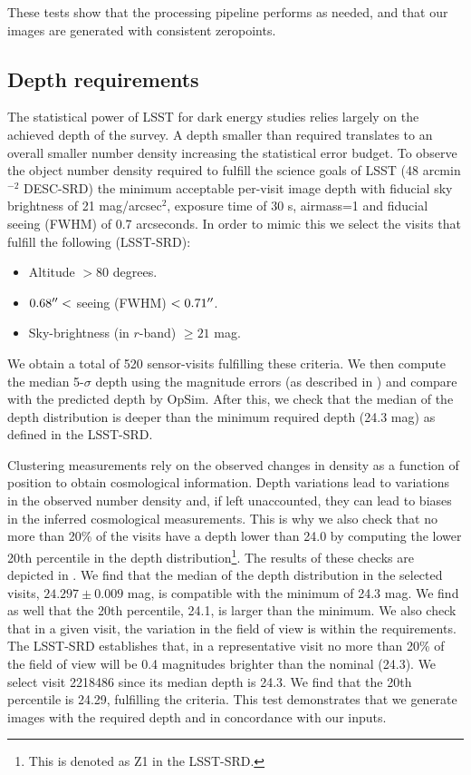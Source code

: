 \documentclass[a4paper,fleqn,usenatbib]{mnras}
\begin{document}
These tests show that the processing pipeline performs as needed, and that our images are generated with consistent zeropoints.

\subsection{Depth requirements}
\label{sssec:depth}
The statistical power of LSST for dark energy studies relies largely on the achieved depth of the survey. A depth smaller than required translates to an overall smaller number density increasing the statistical error budget. To observe the object number density required to fulfill the science goals of LSST (48 arcmin$^{-2}$ DESC-SRD) the minimum acceptable per-visit image depth with fiducial sky brightness of 21 mag/arcsec$^2$, exposure time of 30 s, airmass=1 and fiducial seeing (FWHM) of 0.7 arcseconds. In order to mimic this we select the visits that fulfill the following (LSST-SRD):
\begin{itemize}
\item Altitude $> 80$ degrees.
\item $0.68\hbox{$^{\prime\prime}$} <$ seeing (FWHM) $ < 0.71\hbox{$^{\prime\prime}$}$.
\item Sky-brightness (in $r$-band) $ \geq 21$ mag. 
\end{itemize}
We obtain a total of 520 sensor-visits fulfilling these criteria. We then compute the median 5-$\sigma$ depth  using the magnitude errors (as described in ) and compare with the predicted depth by OpSim. After this, we check that the median of the depth distribution is deeper than the minimum required depth (24.3 mag) as defined in the LSST-SRD. 


Clustering measurements rely on the observed changes in density as a function of position to obtain cosmological information. Depth variations lead to variations in the observed number density and, if left unaccounted, they can lead to biases in the inferred cosmological measurements. This is why we also check that no more than 20\% of the visits have a depth lower than 24.0 by computing the lower 20th percentile in the depth distribution\footnote{This is denoted as Z1 in the LSST-SRD.}. The results of these checks are depicted in . We find that the median of the depth distribution in the selected visits, $24.297 \pm 0.009$ mag, is compatible with the minimum of 24.3 mag. We find as well that the 20th percentile, 24.1, is larger than the minimum. We also check that in a given visit, the variation in the field of view is within the requirements. The LSST-SRD establishes that, in a representative visit no more than 20\% of the field of view will be 0.4 magnitudes brighter than the nominal (24.3). We select visit 2218486 since its median depth is 24.3. We find that the 20th percentile is 24.29, fulfilling the criteria. This test demonstrates that we generate images with the required depth and in concordance with our inputs.
\end{document}
